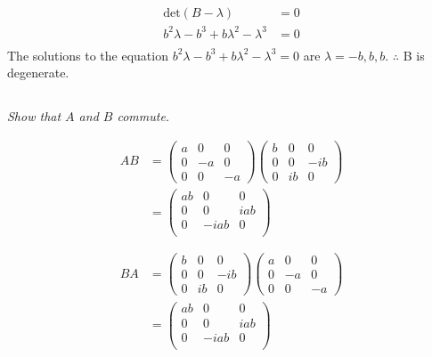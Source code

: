 \documentclass{article}
\begin{document}
\begin{align*}
    \mathrm{det}(B - \lambda) &= 0\\
    b^2 \lambda -b^3+b \lambda ^2-\lambda ^3&= 0\\
\end{align*}
The solutions to the equation $b^2 \lambda -b^3+b \lambda ^2-\lambda ^3= 0$ are $\lambda = -b, b, b$. \newline 
$\therefore$ B is degenerate. 

\subsection{}
\textit{Show that $A$ and $B$ commute.}

\begin{align*}
    AB &= \left(\begin{array}{ccc}
    a & 0 & 0 \\
    0 & -a & 0 \\
    0 & 0 & -a
    \end{array}\right)\left(\begin{array}{ccc}
    b & 0 & 0 \\
    0 & 0 & -i b \\
    0 & i b & 0
    \end{array}\right) \\
    &= \left(\begin{array}{ccc}
     a b & 0 & 0 \\
     0 & 0 & i a b \\
     0 & -i a b & 0 \\
    \end{array}\right)\\
    &\\
    &\\
    BA &= \left(\begin{array}{ccc}
    b & 0 & 0 \\
    0 & 0 & -i b \\
    0 & i b & 0
    \end{array}\right)\left(\begin{array}{ccc}
    a & 0 & 0 \\
    0 & -a & 0 \\
    0 & 0 & -a
    \end{array}\right) \\
    &= \left(\begin{array}{ccc}
     a b & 0 & 0 \\
     0 & 0 & i a b \\
     0 & -i a b & 0 \\
    \end{array}\right)\\
\end{align*}
\end{document}
